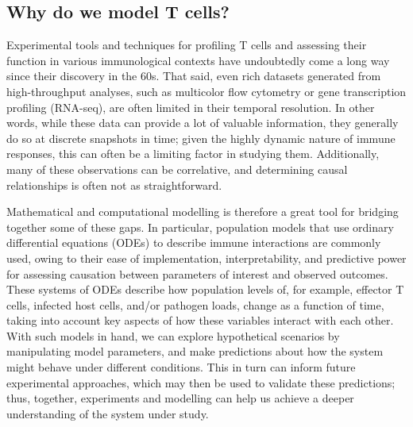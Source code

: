 \subsection{Why do we model T cells?}
\label{sec:intro_overview_modellingTcells}

Experimental tools and techniques for profiling T cells and assessing their function in various immunological contexts have undoubtedly come a long way since their discovery in the 60s. That said, even rich datasets generated from high-throughput analyses, such as multicolor flow cytometry or gene transcription profiling (RNA-seq), are often limited in their temporal resolution. In other words, while these data can provide a lot of valuable information, they generally do so at discrete snapshots in time; given the highly dynamic nature of immune responses, this can often be a limiting factor in studying them. Additionally, many of these observations can be correlative, and determining causal relationships is often not as straightforward.

Mathematical and computational modelling is therefore a great tool for bridging together some of these gaps. In particular, population models that use ordinary differential equations (ODEs) to describe immune interactions are commonly used, owing to their ease of implementation, interpretability, and predictive power for assessing causation between parameters of interest and observed outcomes. These systems of ODEs describe how population levels of, for example, effector T cells, infected host cells, and/or pathogen loads, change as a function of time, taking into account key aspects of how these variables interact with each other. With such models in hand, we can explore hypothetical scenarios by manipulating model parameters, and make predictions about how the system might behave under different conditions. This in turn can inform future experimental approaches, which may then be used to validate these predictions; thus, together, experiments and modelling can help us achieve a deeper understanding of the system under study.


